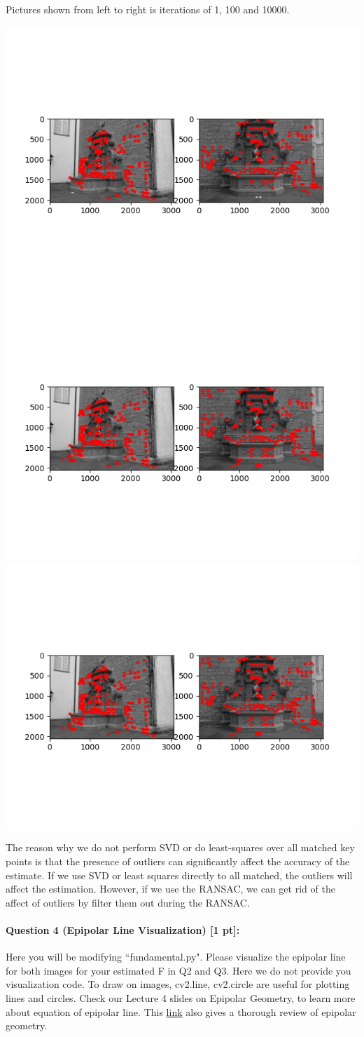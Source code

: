 \documentclass[11pt]{article}
\begin{document}
Pictures shown from left to right is iterations of 1, 100 and 10000.
\begin{center}
    \small
    \includegraphics[width=0.3\linewidth]{fig/q3threshold0.1iter1.png}
    \includegraphics[width=0.3\linewidth]{fig/q3threshold0.1iter10.png}
    \includegraphics[width=0.3\linewidth]{fig/q3threshold0.1iter100.png}
\end{center}

The reason why we do not perform SVD or do least-squares over all matched key points is that the presence of outliers can significantly affect the accuracy of the estimate. If we use SVD or least squares directly to all matched, the outliers will affect the estimation. However, if we use the RANSAC, we can get rid of the affect of outliers by filter them out during the RANSAC.

\paragraph{Question 4 (Epipolar Line Visualization) [1 pt]:} Here you will be modifying ``fundamental.py". Please visualize the epipolar line for both images for your estimated F in Q2 and Q3. Here we do not provide you visualization code. To draw on images, cv2.line, cv2.circle are useful for plotting lines and circles. Check our Lecture 4 slides on Epipolar Geometry, to learn more about equation of epipolar line. This \href{https://web.stanford.edu/class/cs231a/course_notes/03-epipolar-geometry.pdf}{link} also gives a thorough review of epipolar geometry.
\end{document}
